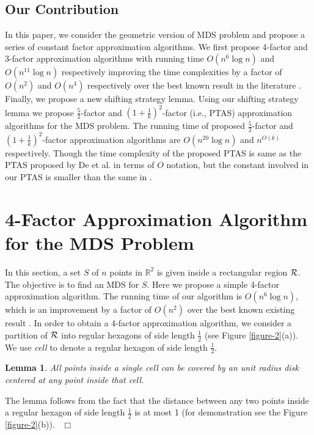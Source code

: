 \documentclass[a4paper,11pt]{article}
\newtheorem{lemma}{Lemma}
\newenvironment{proof}{\noindent {\bf Proof:\,\ }}{\hfill\mbox{\
$\Box$}\smallskip}
\begin{document}
\subsection{Our Contribution}
In this paper, we consider the geometric version of MDS problem and propose a series of constant factor 
approximation algorithms. We first propose 4-factor and 3-factor approximation algorithms with running time 
$O(n^6 \log n)$ and $O(n^{11}\log n)$ respectively improving the time complexities by a factor of $O(n^2)$ and 
$O(n^4)$ respectively over the best known result in the literature \cite{DDCN13}. Finally, we propose a new 
shifting strategy lemma. Using our shifting strategy lemma we propose $\frac{5}{2}$-factor and 
$(1+\frac{1}{k})^2$-factor (i.e., PTAS) approximation algorithms for the MDS problem. The running time of 
proposed $\frac{5}{2}$-factor and $(1+\frac{1}{k})^2$-factor approximation algorithms are $O(n^{20} \log n)$ 
and $n^{O(k)}$ respectively. Though the time complexity of the proposed PTAS is same as the PTAS proposed by 
De et al. \cite{DDCN13} in terms of $O$ notation, but the constant involved in our PTAS is smaller than the 
same in \cite{DDCN13}.

\section{4-Factor Approximation Algorithm for the MDS Problem}\label{4factor}
In this section, a set $S$ of $n$ points in $\mathbb{R}^2$ is given inside a rectangular region ${\cal R}$. The 
objective is to find an MDS for $S$. Here we propose a simple 4-factor approximation algorithm. The running time 
of our algorithm is $O(n^6 \log n)$, which is an improvement by a factor of $O(n^2)$ over the best known existing 
result \cite{DDCN13}. In order to obtain a 4-factor approximation algorithm, we consider a partition of 
${\cal R}$ into regular hexagons of side length $\frac{1}{2}$ (see Figure \ref{figure-2}(a)). We use {\it cell} 
to denote a regular hexagon of side length $\frac{1}{2}$.

\begin{lemma} \label{lemma-1x}
 All points inside a single cell can be covered by an unit radius disk centered at any point inside that cell.
\end{lemma}

\begin{proof}
The lemma follows from the fact that the distance between any two points inside a regular hexagon of side length 
$\frac{1}{2}$  is at most 1 (for demonstration see the Figure \ref{figure-2}(b)).
\end{proof}
\end{document}
